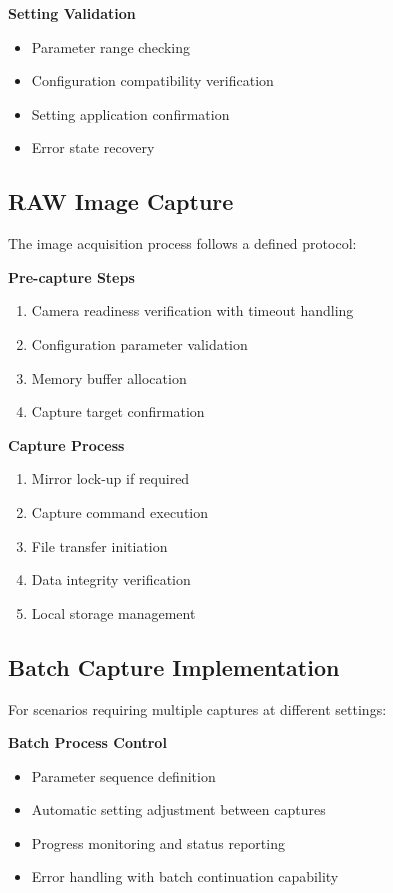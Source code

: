 \textbf{Setting Validation}
\begin{itemize}
    \item Parameter range checking
    \item Configuration compatibility verification
    \item Setting application confirmation
    \item Error state recovery
\end{itemize}

\subsection{RAW Image Capture}
The image acquisition process follows a defined protocol:

\textbf{Pre-capture Steps}
\begin{enumerate}
    \item Camera readiness verification with timeout handling
    \item Configuration parameter validation
    \item Memory buffer allocation
    \item Capture target confirmation
\end{enumerate}

\textbf{Capture Process}
\begin{enumerate}
    \item Mirror lock-up if required
    \item Capture command execution
    \item File transfer initiation
    \item Data integrity verification
    \item Local storage management
\end{enumerate}

\subsection{Batch Capture Implementation}
For scenarios requiring multiple captures at different settings:

\textbf{Batch Process Control}
\begin{itemize}
    \item Parameter sequence definition
    \item Automatic setting adjustment between captures
    \item Progress monitoring and status reporting
    \item Error handling with batch continuation capability
\end{itemize}

